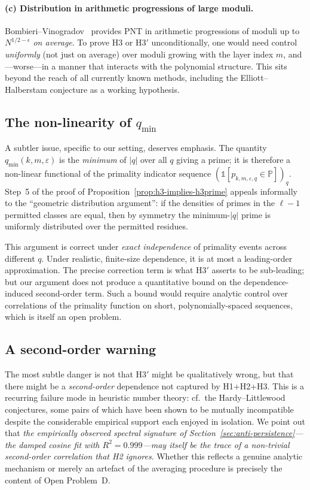 \documentclass[11pt,a4paper]{article}
\theoremstyle{plain}
\theoremstyle{definition}
\newcommand{\qmin}{q_{\min}}
\newcommand{\Prim}{\mathbb{P}}
\newcommand{\eps}{\varepsilon}
\begin{document}
\paragraph{(c) Distribution in arithmetic progressions of large moduli.}
Bombieri--Vinogradov~\cite{bombieri, vinogradov-bv} provides PNT in arithmetic
progressions of moduli up to $N^{1/2-\epsilon}$ \emph{on average}. To prove H3
or H3$'$ unconditionally, one would need control \emph{uniformly} (not just
on average) over moduli growing with the layer index $m$, and---worse---in a
manner that interacts with the polynomial structure. This sits beyond the
reach of all currently known methods, including the Elliott--Halberstam
conjecture as a working hypothesis.

\subsection{The non-linearity of $\qmin$}

A subtler issue, specific to our setting, deserves emphasis. The quantity
$\qmin(k, m, \eps)$ is the \emph{minimum} of $|q|$ over all $q$ giving a prime;
it is therefore a non-linear functional of the primality indicator sequence
$(\mathbb{1}[p_{k,m,\eps,q} \in \Prim])_q$. Step~5 of the proof of
Proposition~\ref{prop:h3-implies-h3prime} appeals informally to the
``geometric distribution argument'': if the densities of primes in the
$\ell-1$ permitted classes are equal, then by symmetry the minimum-$|q|$ prime
is uniformly distributed over the permitted residues.

This argument is correct under \emph{exact independence} of primality events
across different $q$. Under realistic, finite-size dependence, it is at most
a leading-order approximation. The precise correction term is what
H3$'$ asserts to be sub-leading; but our argument does not produce a
quantitative bound on the dependence-induced second-order term. Such a bound
would require analytic control over correlations of the primality function on
short, polynomially-spaced sequences, which is itself an open problem.

\subsection{A second-order warning}
\label{sec:second-order-warning}

The most subtle danger is not that H3$'$ might be qualitatively wrong, but
that there might be a \emph{second-order} dependence not captured by H1+H2+H3.
This is a recurring failure mode in heuristic number theory: cf.\ the
Hardy--Littlewood conjectures, some pairs of which have been shown to be
mutually incompatible despite the considerable empirical support each
enjoyed in isolation. We point out that \emph{the empirically observed
spectral signature of Section~\ref{sec:anti-persistence}---the damped cosine
fit with $R^2 = 0.999$---may itself be the trace of a non-trivial second-order
correlation that H2 ignores}. Whether this reflects a genuine analytic
mechanism or merely an artefact of the averaging procedure is precisely the
content of Open Problem~D.
\end{document}
